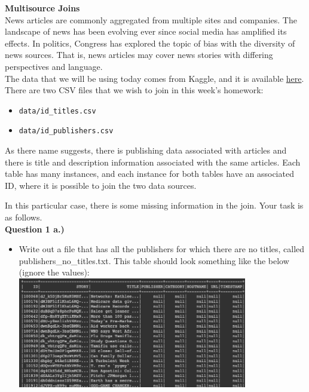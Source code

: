 \documentclass[paper=a4, fontsize=11pt]{scrartcl} %
\author{
    \textbf{YOUR NAME} \\ 
    \textbf{YOUR GIT USERNAME} \\ 
    \textbf{YOUR E-MAIL}
}%
\begin{document}
\maketitle %


{\huge \textbf{Multisource Joins}}  \\

News articles are commonly aggregated from multiple sites and companies. The landscape of news has been evolving ever since social media has amplified its effects. In politics, Congress has explored the topic of bias with the diversity of news sources. That is, news articles may cover news stories with differing perspectives and language. \\

The data that we will be using today comes from Kaggle, and it is available \href{https://course.ccs.neu.edu/cs6220/homework-3/}{here}. There are two CSV files that we wish to join in this week's homework:

\begin{itemize}
    \item \verb"data/id_titles.csv"
    \item \verb"data/id_publishers.csv"
\end{itemize}

As there name suggests, there is publishing data associated with articles and there is title and description information associated with the same articles. Each table has many instances, and each instance for both tables have an associated ID, where it is possible to join the two data sources.

In this particular case, there is some missing information in the join. Your task is as follows. \\

\textbf{Question 1 a.)}
\begin{itemize}
    \item Write out a file that has all the publishers for which there are no titles, called publishers\_no\_titles.txt. This table should look something like the below (ignore the values): \\
    \includegraphics[width=100mm]{images/pub_no_title.png}
\end{itemize} \\
\end{document}

